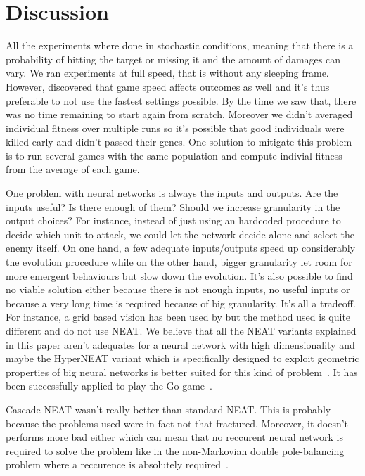 \section{Discussion}\label{section:discussion}

All the experiments where done in stochastic conditions, meaning that there is a
probability of hitting the target or missing it and the amount of damages
can vary.
We ran experiments at full speed, that is without any sleeping frame.
However, \citet{Liu14EffectiveMicro} discovered that game speed affects outcomes as well
and it's thus preferable to not use the fastest settings possible.
By the time we saw that, there was no time remaining to start again from scratch.
Moreover we didn't averaged individual fitness over multiple runs so it's possible that
good individuals were killed early and didn't passed their genes.
One solution to mitigate this problem is to run several games with the
same population and compute indivial fitness from the average of each game.

One problem with neural networks is always the inputs and outputs.
Are the inputs useful? Is there enough of them? Should we increase granularity
in the output choices? For instance, instead of just using an hardcoded procedure
to decide which unit to attack, we could let the network decide alone and select
the enemy itself. On one hand, a few adequate inputs/outputs speed up considerably
the evolution procedure while on the other hand, bigger granularity let room for more
emergent behaviours but slow down the evolution. It's also possible to find no viable
solution either because there is not enough inputs, no useful inputs or because
a very long time is required because of big granularity. It's all a tradeoff.
For instance, a grid based vision has been used by \citet{Shantia11ConnectionistSC} but the method
used is quite different and do not use NEAT. We believe that all the NEAT variants
explained in this paper aren't adequates for a neural network with high dimensionality
and maybe the HyperNEAT variant which is specifically designed to exploit geometric
properties of big neural networks is better suited for this kind of
problem~\cite{Stanley09HyperNEAT, Gauci10TopographicRegularities}. It has been
successfully applied to play the Go game~\cite{Gauci10Go}.

Cascade-NEAT wasn't really better than standard NEAT.
This is probably because the problems used were in fact not that fractured.
Moreover, it doesn't performs more bad either which can mean that
no reccurent neural network is required to solve the problem like in the
non-Markovian double pole-balancing problem where a reccurence is absolutely
required~\cite{Kohl09FracturedProblems}.

